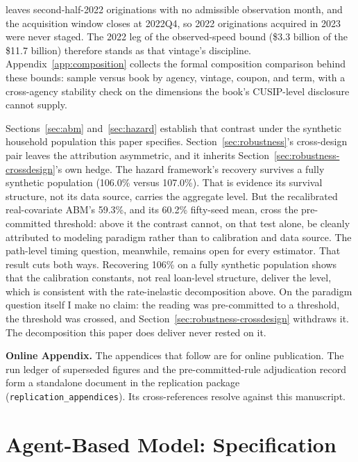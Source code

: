 \documentclass[12pt]{article}
\begin{document}
leaves second-half-2022 originations with no admissible observation month, and the acquisition window closes at 2022Q4, so 2022 originations acquired in 2023 were never staged. The 2022 leg of the observed-speed bound (\$3.3 billion of the \$11.7 billion) therefore stands as that vintage's discipline. Appendix~\ref{app:composition} collects the formal composition comparison behind these bounds: sample versus book by agency, vintage, coupon, and term, with a cross-agency stability check on the dimensions the book's CUSIP-level disclosure cannot supply.

Sections~\ref{sec:abm} and~\ref{sec:hazard} establish that contrast under the synthetic household population this paper specifies. Section~\ref{sec:robustness}'s cross-design pair leaves the attribution asymmetric, and it inherits Section~\ref{sec:robustness-crossdesign}'s own hedge. The hazard framework's recovery survives a fully synthetic population (106.0\% versus 107.0\%). That is evidence its survival structure, not its data source, carries the aggregate level. But the recalibrated real-covariate ABM's 59.3\%, and its 60.2\% fifty-seed mean, cross the pre-committed threshold: above it the contrast cannot, on that test alone, be cleanly attributed to modeling paradigm rather than to calibration and data source. The path-level timing question, meanwhile, remains open for every estimator. That result cuts both ways. Recovering 106\% on a fully synthetic population shows that the calibration constants, not real loan-level structure, deliver the level, which is consistent with the rate-inelastic decomposition above. On the paradigm question itself I make no claim: the reading was pre-committed to a threshold, the threshold was crossed, and Section~\ref{sec:robustness-crossdesign} withdraws it. The decomposition this paper does deliver never rested on it.

\clearpage



\clearpage
\appendix

\noindent\textbf{Online Appendix.} The appendices that follow are for online publication. The run ledger of superseded figures and the pre-committed-rule adjudication record form a standalone document in the replication package (\texttt{replication\_appendices}). Its cross-references resolve against this manuscript.

\section{Agent-Based Model: Specification}\label{sec:method-abm}
\end{document}
